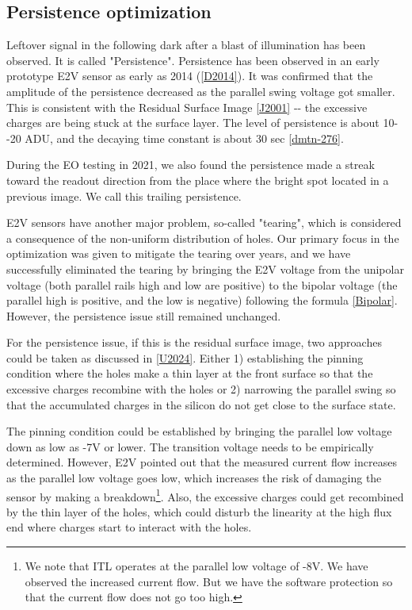 \subsection{Persistence optimization}\label{persistence-optimization}

Leftover signal in the following dark after a blast of illumination has
been observed. It is called "Persistence". Persistence has been observed
in an early prototype E2V sensor as early as 2014
(\hyperref[D2014]{{[}D2014{]}}). It was confirmed that the amplitude of
the persistence decreased as the parallel swing voltage got smaller.
This is consistent with the Residual Surface Image
\hyperref[J2001]{{[}J2001{]}} -\/- the excessive charges are being stuck
at the surface layer. The level of persistence is about 10-\/-20 ADU,
and the decaying time constant is about 30 sec
\hyperref[dmtn-276]{{[}dmtn-276{]}}.

During the EO testing in 2021, we also found the persistence made a
streak toward the readout direction from the place where the bright spot
located in a previous image. We call this trailing persistence.

E2V sensors have another major problem, so-called "tearing", which is
considered a consequence of the non-uniform distribution of holes. Our
primary focus in the optimization was given to mitigate the tearing over
years, and we have successfully eliminated the tearing by bringing the
E2V voltage from the unipolar voltage (both parallel rails high and low
are positive) to the bipolar voltage (the parallel high is positive, and
the low is negative) following the formula
\hyperref[Bipolar]{{[}Bipolar{]}}. However, the persistence issue still
remained unchanged.

For the persistence issue, if this is the residual surface image, two
approaches could be taken as discussed in \hyperref[U2024]{{[}U2024{]}}.
Either 1) establishing the pinning condition where the holes make a thin
layer at the front surface so that the excessive charges recombine with
the holes or 2) narrowing the parallel swing so that the accumulated
charges in the silicon do not get close to the surface state.

The pinning condition could be established by bringing the parallel low
voltage down as low as -7V or lower. The transition voltage needs to be
empirically determined. However, E2V pointed out that the measured
current flow increases as the parallel low voltage goes low, which
increases the risk of damaging the sensor by making a
breakdown\footnote{We note that ITL operates at the parallel low voltage
  of -8V. We have observed the increased current flow. But we have the
  software protection so that the current flow does not go too high.}.
Also, the excessive charges could get recombined by the thin layer of
the holes, which could disturb the linearity at the high flux end where
charges start to interact with the holes.

